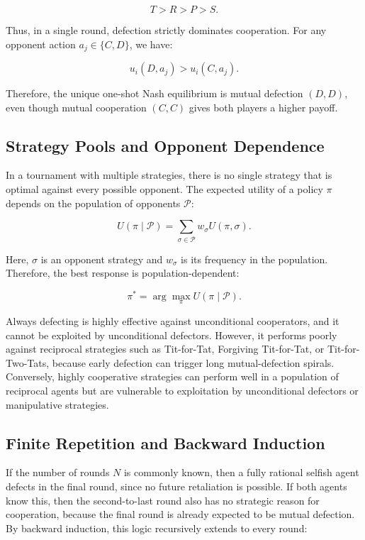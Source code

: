\documentclass[11pt]{article}
\begin{document}
\[
T > R > P > S.
\]

Thus, in a single round, defection strictly dominates cooperation. For any opponent action $a_j \in \{C,D\}$, we have:

\[
u_i(D,a_j) > u_i(C,a_j).
\]

Therefore, the unique one-shot Nash equilibrium is mutual defection $(D,D)$, even though mutual cooperation $(C,C)$ gives both players a higher payoff.



\subsection{Strategy Pools and Opponent Dependence}

In a tournament with multiple strategies, there is no single strategy that is optimal against every possible opponent. The expected utility of a policy $\pi$ depends on the population of opponents $\mathcal{P}$:

\[
U(\pi \mid \mathcal{P}) = \sum_{\sigma \in \mathcal{P}} w_{\sigma} U(\pi,\sigma).
\]

Here, $\sigma$ is an opponent strategy and $w_{\sigma}$ is its frequency in the population. Therefore, the best response is population-dependent:

\[
\pi^* = \arg\max_{\pi} U(\pi \mid \mathcal{P}).
\]

Always defecting is highly effective against unconditional cooperators, and it cannot be exploited by unconditional defectors. However, it performs poorly against reciprocal strategies such as Tit-for-Tat, Forgiving Tit-for-Tat, or Tit-for-Two-Tats, because early defection can trigger long mutual-defection spirals. Conversely, highly cooperative strategies can perform well in a population of reciprocal agents but are vulnerable to exploitation by unconditional defectors or manipulative strategies.

\subsection{Finite Repetition and Backward Induction}

If the number of rounds $N$ is commonly known, then a fully rational selfish agent defects in the final round, since no future retaliation is possible. If both agents know this, then the second-to-last round also has no strategic reason for cooperation, because the final round is already expected to be mutual defection. By backward induction, this logic recursively extends to every round:
\end{document}
